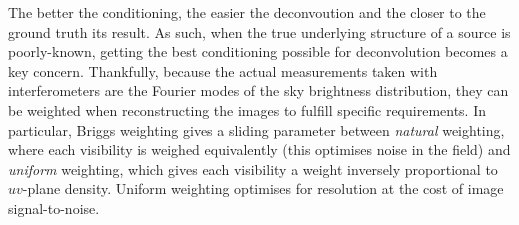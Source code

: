 \pg
The better the conditioning, the easier the deconvoution and the closer to the ground truth its result. As such, when the true underlying structure of a source is poorly-known, getting the best conditioning possible for deconvolution becomes a key concern. Thankfully, because the actual measurements taken with interferometers are the Fourier modes of the sky brightness distribution, they can be weighted when reconstructing the images to fulfill specific requirements. In particular, Briggs weighting  gives a sliding parameter between \emph{natural} weighting, where each visibility is weighed equivalently (this optimises noise in the field) and \emph{uniform} weighting, which gives each visibility a weight inversely proportional to $uv$-plane density. Uniform weighting optimises for resolution at the cost of image signal-to-noise.

